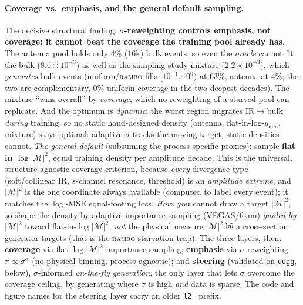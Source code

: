 \documentclass[11pt]{article}
\newcommand{\code}[1]{\texttt{#1}}
\begin{document}
\paragraph{Coverage vs.\ emphasis, and the general default sampling.} The decisive
structural finding: \textbf{$\sigma$-reweighting controls emphasis, not coverage: it cannot beat
the coverage the training pool already has}. The antenna pool holds only $4$\% ($16$k) bulk events,
so even the \emph{oracle} cannot fit the bulk ($8.6\!\times\!10^{-3}$) as well as the sampling-study
mixture ($2.2\!\times\!10^{-3}$), which \emph{generates} bulk events (uniform/\textsc{rambo} fills
$[10^{-1},10^0)$ at $63$\%, antenna at $4$\%; the two are complementary, $0$\% uniform coverage in
the two deepest decades). The mixture ``wins overall'' by \emph{coverage}, which no reweighting of a
starved pool can replicate. And the optimum is \emph{dynamic}: the worst region migrates IR$\to$bulk
\emph{during} training, so no static hand-designed density (antenna, flat-in-log-$y_{\min}$,
mixture) stays optimal: adaptive $\sigma$ tracks the moving target, static densities cannot.
\emph{The general default} (subsuming the process-specific proxies): sample \textbf{flat in
$\log|\mathcal{M}|^2$}, equal training density per amplitude decade. This is the universal,
structure-agnostic coverage criterion, because \emph{every} divergence type (soft/collinear IR,
$s$-channel resonance, threshold) is an \emph{amplitude extreme}, and $|\mathcal{M}|^2$ is the one
coordinate always available (computed to label every event); it matches the $\log$-MSE
equal-footing loss. \emph{How:} you cannot draw a target $|\mathcal{M}|^2$, so shape the density by
adaptive importance sampling (VEGAS/foam) \emph{guided by} $|\mathcal{M}|^2$ toward
flat-in-$\log|\mathcal{M}|^2$, \emph{not} the physical measure $|\mathcal{M}|^2\mathrm{d}\Phi$ a
cross-section generator targets (that is the \textsc{rambo} starvation trap). The three layers, then:
\textbf{coverage} via flat-$\log|\mathcal{M}|^2$ importance sampling; \textbf{emphasis} via
$\sigma$-reweighting $\pi\!\propto\!\sigma^\alpha$ (no physical binning, process-agnostic); and
\textbf{steering} (validated on \code{uugg}, below), $\sigma$-informed \emph{on-the-fly
generation}, the only layer that lets $\sigma$ overcome the coverage ceiling, by generating where
$\sigma$ is high \emph{and} data is sparse. The code and figure names for the steering layer carry an
older \code{l2\_} prefix.
\end{document}
